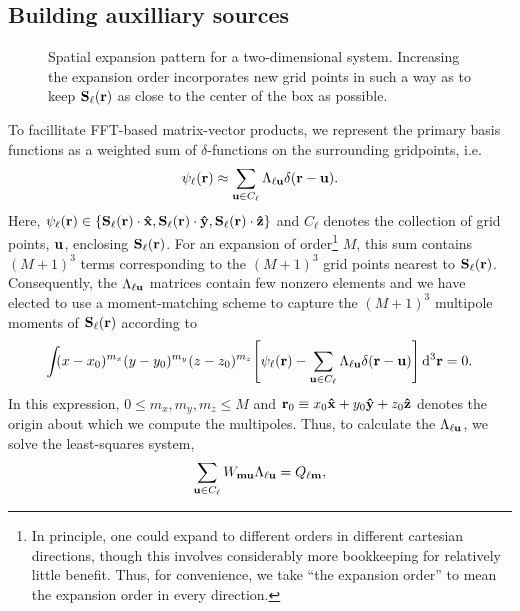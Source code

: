 \subsection{Building auxilliary sources}

\begin{figure}
  \centering
  \caption{\label{fig:expansion grid}Spatial expansion pattern for a two-dimensional system.
    Increasing the expansion order incorporates new grid points in such a way as to keep $\vb{S}_\ell(\vb{r})$ as close to the center of the box as possible.
  }
\end{figure}

To facillitate FFT-based matrix-vector products, we represent the primary basis functions as a weighted sum of $\delta$-functions on the surrounding gridpoints, i.e.
\begin{equation}
  \psi_\ell(\vb{r}) \approx \sum_{\vb{u} \in C_{\ell}} \Lambda_{\ell\vb{u}} \delta(\vb{r} - \vb{u}).
  \label{eq:grid linear combination}
\end{equation}
Here, $\psi_\ell(\vb{r}) \in \qty{\vb{S}_\ell(\vb{r})\cdot \vu{x}, \vb{S}_\ell(\vb{r}) \cdot \vu{y}, \vb{S}_\ell(\vb{r}) \cdot \vu{z}}$ and $C_\ell$ denotes the collection of grid points, $\vb{u}$, enclosing $\vb{S}_\ell(\vb{r})$.
For an expansion of order\footnote{In principle, one could expand to different orders in different cartesian directions, though this involves considerably more bookkeeping for relatively little benefit. Thus, for convenience, we take ``the expansion order'' to mean the expansion order in every direction.} $M$, this sum contains $(M + 1)^3$ terms corresponding to the $(M + 1)^3$ grid points nearest to $\vb{S}_\ell(\vb{r})$.
Consequently, the $\Lambda_{\ell \vb{u}}$ matrices contain few nonzero elements and we have elected to use a moment-matching scheme to capture the $(M + 1)^3$ multipole moments of $\vb{S}_\ell(\vb{r})$ according to
\begin{equation}
  \int_{} \kern0.1em (x - x_0)^{m_x}(y - y_0)^{m_y}(z - z_0)^{m_z} \qty[\psi_\ell(\vb{r}) - \sum_{\vb{u} \in C_\ell}\Lambda_{\ell\vb{u}}\delta(\vb{r} - \vb{u})] \dd[3]{\vb{r}} = 0.
  \label{eq:moment matching}
\end{equation}
In this expression, $0 \leqslant m_x, m_y, m_z \leqslant M$ and $\vb{r}_0 \equiv x_0 \vu{x} + y_0 \vu{y} + z_0\vu{z}$ denotes the origin about which we compute the multipoles.
Thus, to calculate the $\Lambda_{\ell \vb{u}}$, we solve the least-squares system,
\begin{equation}
  \sum_{\vb{u} \in C_\ell} W_{\vb{m}\vb{u}}\Lambda_{\ell\vb{u}} = Q_{\ell\vb{m}},
  \label{eq:expansion matrix system}
\end{equation}
